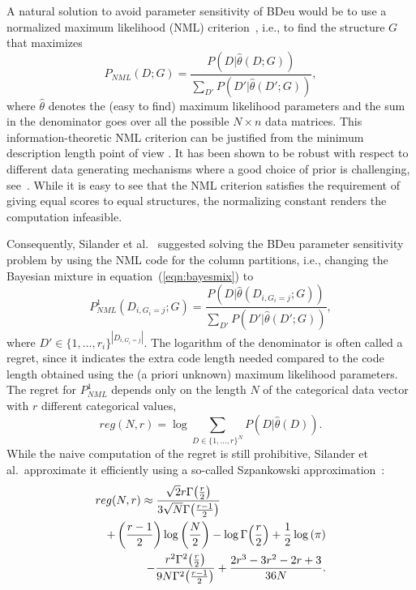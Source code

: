 A natural solution to avoid parameter sensitivity of BDeu would be to
use a normalized maximum likelihood (NML)
criterion~\cite{Shta87,Riss96a}, i.e., to find the structure $G$ that
maximizes
\begin{equation}
P_{NML}(D;G)=\frac{P(D|\hat\theta(D;G))}{\sum_{D'}{P(D'|\hat\theta(D';G))}},
\end{equation}
where $\hat\theta$ denotes the (easy to find) maximum likelihood
parameters and the sum in the denominator goes over all the possible
$N\times n$ data matrices. This information-theoretic NML criterion
can be justified from the minimum description length point of view
\cite{Riss78,Grun07}. It has been shown to be robust with respect to
different data generating mechanisms where a good choice of prior
is challenging, see~\cite{eggeling2014robust,maatta16}. While it is
easy to see that the NML criterion satisfies the requirement of giving
equal scores to equal structures, the normalizing constant renders the
computation infeasible.

Consequently, Silander et al.~\cite{cosco.pgm08a}
suggested solving the BDeu parameter sensitivity problem by using the
NML code for the column partitions, i.e., changing the Bayesian mixture
in equation~(\ref{eqn:bayesmix}) to
\begin{equation}
P^1_{NML}(D_{i,G_i=j};G)=\frac{P(D|\hat\theta(D_{i,G_i=j};G))}{\sum_{D'}{P(D'|\hat\theta(D';G))}},
\end{equation}
where $D'\in{\{1,\ldots,r_i\}}^{|D_{i,G_i=j}|}$.  The logarithm of the
denominator is often called a regret, since it indicates the extra
code length needed compared to the code length obtained using the (a
priori unknown) maximum likelihood parameters. The regret for
$P^1_{NML}$ depends only on the length $N$ of the categorical data
vector with $r$ different categorical values,
\begin{equation}
reg(N,r)=\log \sum_{D\in \{1,\ldots,r\}^N} P(D|\hat\theta(D)).
\end{equation}
While the naive
computation of the regret is still prohibitive, Silander et al.\
approximate it efficiently using a so-called Szpankowski
approximation~\cite{cosco.aistat03}:
\begin{eqnarray}
\label{eqn:szp1}
\lefteqn{reg(N,r) \approx \frac{\sqrt{2} r \Gamma{\left(\frac{r}{2} \right)}}
                               {3 \sqrt{N} \Gamma{\left(\frac{r-1}{2}  \right)}}} \\
&&+ \left(\frac{r-1}{2}\right) \log{\left (\frac{N}{2} \right )}
- \log \Gamma{\left(\frac{r}{2} \right)} + \frac{1}{2} \log{\left (\pi \right )}\nonumber\\
&&- \frac{r^{2} \Gamma^{2}{\left(\frac{r }{2} \right)}}
         {9N \Gamma^{2}{\left(\frac{r-1}{2}\right)}}
+ \frac{2r^3-3r^2-2r+3}{36N}\nonumber.
\end{eqnarray}

